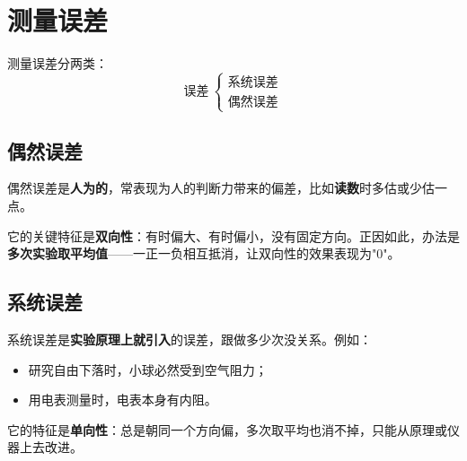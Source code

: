 \chapter{测量误差}

测量误差分两类：
\[
\text{误差}\ \begin{cases}\text{系统误差}\\[2pt]\text{偶然误差}\end{cases}
\]

\section{偶然误差}

偶然误差是\textbf{人为的}，常表现为人的判断力带来的偏差，比如\textbf{读数}时多估或少估一点。

它的关键特征是\textbf{双向性}：有时偏大、有时偏小，没有固定方向。正因如此，办法是\textbf{多次实验取平均值}——一正一负相互抵消，让双向性的效果表现为"$0$"。

\section{系统误差}

系统误差是\textbf{实验原理上就引入}的误差，跟做多少次没关系。例如：

\begin{itemize}
    \item 研究自由下落时，小球必然受到空气阻力；
    \item 用电表测量时，电表本身有内阻。
\end{itemize}

它的特征是\textbf{单向性}：总是朝同一个方向偏，多次取平均也消不掉，只能从原理或仪器上去改进。

